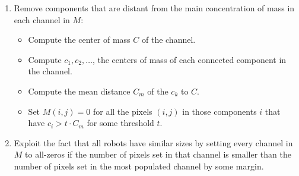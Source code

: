 \documentclass[10pt,a4paper,twocolumn]{article}
\begin{document}
\begin{enumerate}
    \item
    Remove components that are distant from the main concentration of mass in
    each channel in $M$:
    \begin{itemize}
        \item
        Compute the center of mass $C$ of the channel.
        \item
        Compute $c_1, c_2, \ldots$, the centers of mass of each connected 
        component in the channel.
        \item
        Compute the mean distance $C_m$ of the $c_k$ to $C$.
        \item
        Set $M(i,j) = 0$ for all the pixels $(i,j)$ in those components $i$ that
        have $c_i > t \cdot C_m$ for some threshold $t$.
    \end{itemize}

    \item
    Exploit the fact that all robots have similar sizes by setting every channel
    in $M$ to all-zeros if the number of pixels set in that channel is smaller
    than the number of pixels set in the most populated channel by some margin.
\end{enumerate} 
\end{document}
